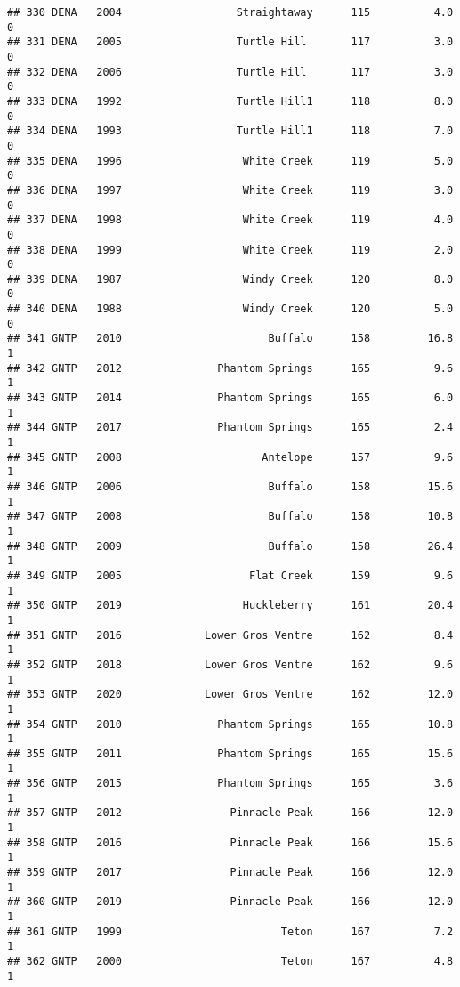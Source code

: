 \documentclass[
]{article}
\begin{document}
\begin{verbatim}
## 330 DENA   2004                  Straightaway      115          4.0       0
## 331 DENA   2005                  Turtle Hill       117          3.0       0
## 332 DENA   2006                  Turtle Hill       117          3.0       0
## 333 DENA   1992                  Turtle Hill1      118          8.0       0
## 334 DENA   1993                  Turtle Hill1      118          7.0       0
## 335 DENA   1996                   White Creek      119          5.0       0
## 336 DENA   1997                   White Creek      119          3.0       0
## 337 DENA   1998                   White Creek      119          4.0       0
## 338 DENA   1999                   White Creek      119          2.0       0
## 339 DENA   1987                   Windy Creek      120          8.0       0
## 340 DENA   1988                   Windy Creek      120          5.0       0
## 341 GNTP   2010                       Buffalo      158         16.8       1
## 342 GNTP   2012               Phantom Springs      165          9.6       1
## 343 GNTP   2014               Phantom Springs      165          6.0       1
## 344 GNTP   2017               Phantom Springs      165          2.4       1
## 345 GNTP   2008                      Antelope      157          9.6       1
## 346 GNTP   2006                       Buffalo      158         15.6       1
## 347 GNTP   2008                       Buffalo      158         10.8       1
## 348 GNTP   2009                       Buffalo      158         26.4       1
## 349 GNTP   2005                    Flat Creek      159          9.6       1
## 350 GNTP   2019                   Huckleberry      161         20.4       1
## 351 GNTP   2016             Lower Gros Ventre      162          8.4       1
## 352 GNTP   2018             Lower Gros Ventre      162          9.6       1
## 353 GNTP   2020             Lower Gros Ventre      162         12.0       1
## 354 GNTP   2010               Phantom Springs      165         10.8       1
## 355 GNTP   2011               Phantom Springs      165         15.6       1
## 356 GNTP   2015               Phantom Springs      165          3.6       1
## 357 GNTP   2012                 Pinnacle Peak      166         12.0       1
## 358 GNTP   2016                 Pinnacle Peak      166         15.6       1
## 359 GNTP   2017                 Pinnacle Peak      166         12.0       1
## 360 GNTP   2019                 Pinnacle Peak      166         12.0       1
## 361 GNTP   1999                         Teton      167          7.2       1
## 362 GNTP   2000                         Teton      167          4.8       1

\end{verbatim}
\end{document}
